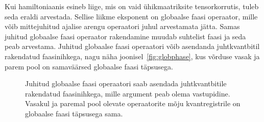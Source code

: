 \documentclass[12pt]{report}
\begin{document}
Kui hamiltoniaanis esineb liige, mis on vaid ühikmaatriksite tensorkorrutis, tuleb seda eraldi arvestada.
Sellise liikme eksponent on globaalse faasi operaator, mille võib mittejuhitud ajalise arengu operaatori juhul arvestamata jätta.
Samas juhitud globaalse faasi operaator rakendamine muudab suhtelist faasi ja seda peab arvestama.
Juhitud globaalse faasi operaatori võib asendanda juhtkvantbitil rakendatud faasinihkega, nagu näha joonisel~\ref{fig:globphase}, kus võrduse vasak ja parem pool on samaväärsed globaalse faasi täpsusega.

\begin{figure}[h]
    \centering
    \ifdefined\yquanton
    \fi
    \caption{Juhitud globaalse faasi operaatori saab asendada juhtkvantbitile rakendatud faasinihkega, mille argument peab olema vastupidine. Vasakul ja paremal pool olevate operaatorite mõju kvantregistrile on globaalse faasi täpsusega sama.}
\end{figure}
\end{document}
